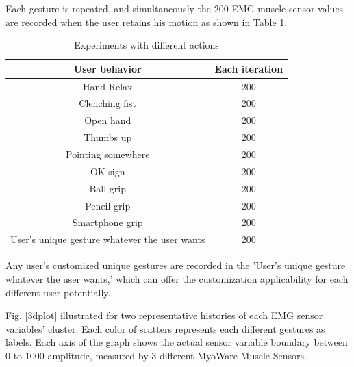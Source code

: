 \documentclass[conference]{IEEEtran}
\begin{document}
Each gesture is repeated, and simultaneously the 200 EMG muscle sensor values are recorded when the user retains his motion as shown in Table 1.

\begin{table}[ht]
\caption{Experiments with different actions} %
\centering %
\begin{tabular}{c c} %
\hline\hline %
User behavior & Each iteration \\ [0.5ex] %
\hline %
Hand Relax & 200 \\ %
Clenching fist & 200 \\
Open hand & 200 \\
Thumbs up & 200 \\
Pointing somewhere & 200 \\
OK sign & 200 \\
Ball grip & 200 \\
Pencil grip & 200 \\
Smartphone grip & 200 \\
User's unique gesture whatever the user wants & 200 \\ [1ex] %
\hline %
\end{tabular}
\label{table:nonlin} %
\end{table}

Any user's customized unique gestures are recorded in the 'User's unique gesture whatever the user wants,' which can offer the customization applicability for each different user potentially.



Fig. \ref{3dplot} illustrated for two representative histories of each EMG sensor variables' cluster. Each color of scatters represents each different gestures as labels. Each axis of the graph shows the actual sensor variable boundary between 0 to 1000 amplitude, measured by 3 different MyoWare Muscle Sensors. 
\end{document}
